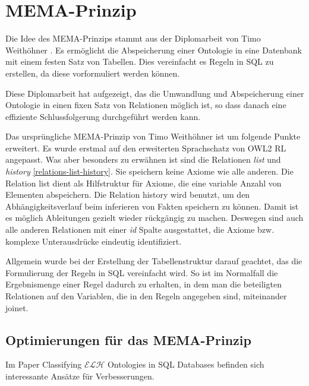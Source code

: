 \section{MEMA-Prinzip}
\label{abschnitt-mema-prinzip}
Die Idee des MEMA-Prinzips stammt aus der Diplomarbeit von Timo Weithöhner \cite{Weithoehner2003}. Es ermöglicht die Abspeicherung einer Ontologie in eine Datenbank mit einem festen Satz von Tabellen. Dies vereinfacht es Regeln in SQL zu erstellen, da diese vorformuliert werden können.

Diese Diplomarbeit hat aufgezeigt, das die Umwandlung und Abspeicherung einer Ontologie in einen fixen Satz von Relationen möglich ist, so dass danach eine effiziente Schlussfolgerung durchgeführt werden kann.

Das ursprüngliche MEMA-Prinzip von Timo Weithöhner ist um folgende Punkte erweitert.
Es wurde erstmal auf den erweiterten Sprachschatz von OWL2 RL angepasst. Was aber besonders zu erwähnen ist sind die Relationen \emph{list} und \emph{history} \ref{relations-list-history}. Sie speichern keine Axiome wie alle anderen. Die Relation list dient als Hilfstruktur für Axiome, die eine variable Anzahl von Elementen abspeichern. Die Relation history wird benutzt, um den Abhängigkeitsverlauf beim inferieren von Fakten speichern zu können. Damit ist es möglich Ableitungen gezielt wieder rückgängig zu machen. Deswegen sind auch alle anderen Relationen mit einer \emph{id} Spalte ausgestattet, die Axiome bzw. komplexe Unterausdrücke eindeutig identifiziert.

Allgemein wurde bei der Erstellung der Tabellenstruktur darauf geachtet, das die Formulierung der Regeln in SQL vereinfacht wird. So ist im Normalfall die Ergebnismenge einer Regel dadurch zu erhalten, in dem man die beteiligten Relationen auf den Variablen, die in den Regeln angegeben sind, miteinander joinet.



\subsection{Optimierungen für das MEMA-Prinzip}

Im Paper Classifying $\mathcal{ELH}$ Ontologies in SQL Databases \cite{Delaitre2009} befinden sich interessante Ansätze für Verbesserungen.


